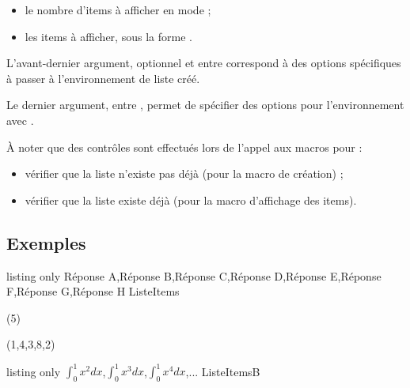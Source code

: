 \documentclass[french,11pt,a4paper]{article}
\begin{document}
\begin{itemize}
	\item le nombre d'items à afficher en mode  ;
	\item les items à afficher, sous la forme .
\end{itemize}

L'avant-dernier argument, optionnel et entre  correspond à des options spécifiques à passer à l'environnement de liste  créé.

Le dernier argument, entre , permet de spécifier des options pour l'environnement  avec .

\medskip

À noter que des contrôles sont effectués lors de l'appel aux macros pour :

\begin{itemize}
	\item vérifier que la liste n'existe pas déjà (pour la macro de création) ;
	\item vérifier que la liste existe déjà (pour la macro d'affichage des items).
\end{itemize}
\subsection{Exemples}

\begin{DemoCode}{listing only}
\CreerListeItems%
    {Réponse A,Réponse B,Réponse C,Réponse D,Réponse E,Réponse F,Réponse G,Réponse H}%
    {\malisteditems}{ListeItems}
\end{DemoCode}


\begin{DemoCode}{}
(5)
\end{DemoCode}

\begin{DemoCode}{}
(1,4,3,8,2)
\end{DemoCode}

\begin{DemoCode}{listing only}
\CreerListeItems%
    {{$\int_0^1 x^2 dx$},{$\int_0^1 x^3 dx$},{$\int_0^1 x^4 dx$},...}%
    {\malisteditemsb}{ListeItemsB}
\end{DemoCode}
\end{document}
